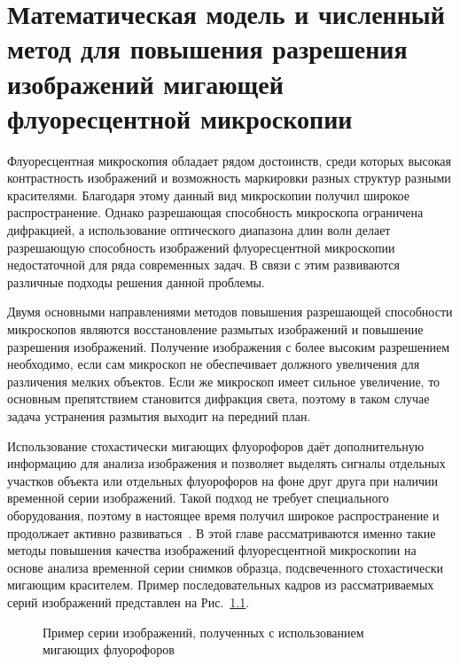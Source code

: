 \chapter{Математическая модель и численный метод для повышения разрешения изображений мигающей флуоресцентной микроскопии}\label{ch:ch1}

Флуоресцентная микроскопия обладает рядом достоинств, среди которых высокая контрастность изображений и возможность маркировки разных структур разными красителями. Благодаря этому данный вид микроскопии получил широкое распространение. Однако разрешающая способность микроскопа ограничена дифракцией, а использование оптического диапазона длин волн делает разрешающую способность изображений флуоресцентной микроскопии недостаточной для ряда современных задач. В связи с этим развиваются различные подходы решения данной проблемы.

Двумя основными направлениями методов повышения разрешающей способности микроскопов являются восстановление размытых изображений и повышение разрешения изображений. Получение изображения с более высоким разрешением необходимо, если сам микроскоп не обеспечивает должного увеличения для различения мелких объектов. Если же микроскоп имеет сильное увеличение, то основным препятствием становится дифракция света, поэтому в таком случае задача устранения размытия выходит на передний план.

Использование стохастически мигающих флуорофоров даёт дополнительную информацию для анализа изображения и позволяет выделять сигналы отдельных участков объекта или отдельных флуорофоров на фоне друг друга при наличии временной серии изображений. Такой подход не требует специального оборудования, поэтому в настоящее время получил широкое распространение и продолжает активно развиваться~\cite{мишин2019флуоресцентная}. В этой главе рассматриваются именно такие методы повышения качества изображений флуоресцентной микроскопии на основе анализа временной серии снимков образца, подсвеченного стохастически мигающим красителем. Пример последовательных кадров из рассматриваемых серий изображений представлен на Рис.~\ref{fig:blinking-samples}.

\begin{figure}[ht]
	\caption{Пример серии изображений, полученных с использованием мигающих флуорофоров}
	\label{fig:blinking-samples}
\end{figure}

